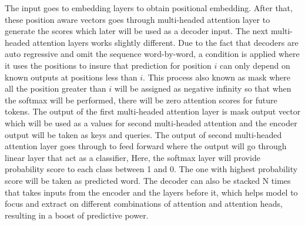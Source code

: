 The input goes to embedding layers to obtain positional embedding. After that, these position aware vectors goes through multi-headed attention layer to generate the scores which later will be used as a decoder input. The next multi-headed attention layers works slightly different. Due to the fact that decoders are auto regressive and omit the sequence word-by-word, a condition is applied where it uses the positions to insure that prediction for position $i$ can only depend on known outputs at positions less than $i$. This process also known as mask where all the position greater than $i$ will be assigned as negative infinity so that when the softmax will be performed, there will be zero attention scores for future tokens. The output of the first multi-headed attention layer is mask output vector which will be used as a values for second multi-headed attention and the encoder output will be taken as keys and queries. The output of second multi-headed attention layer goes through to feed forward where the output will go through linear layer that act as a classifier, Here, the softmax layer will provide probability score to each class between 1 and 0. The one with highest probability score will be taken as predicted word. The decoder can also be stacked N times that takes inputs from the encoder and the layers before it, which helps model to focus and extract on different combinations of attention and attention heads, resulting in a boost of predictive power.











